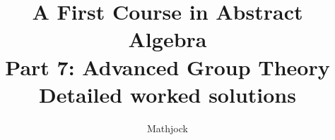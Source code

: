
\title{\textbf{A First Course in Abstract Algebra}\\[0.3em]Part 7: Advanced Group Theory\\[0.3em]\large Detailed worked solutions}
\author{Mathjock}
\date{}

\maketitle
\bookinfo
\tableofcontents
\clearpage
\renewcommand{\thesection}{34}
\renewcommand{\theHsection}{fraleigh.34}

\clearpage
\renewcommand{\thesection}{35}
\renewcommand{\theHsection}{fraleigh.35}

\clearpage
\renewcommand{\thesection}{36}
\renewcommand{\theHsection}{fraleigh.36}

\clearpage
\renewcommand{\thesection}{37}
\renewcommand{\theHsection}{fraleigh.37}

\clearpage
\renewcommand{\thesection}{38}
\renewcommand{\theHsection}{fraleigh.38}

\clearpage
\renewcommand{\thesection}{39}
\renewcommand{\theHsection}{fraleigh.39}

\clearpage
\renewcommand{\thesection}{40}
\renewcommand{\theHsection}{fraleigh.40}


